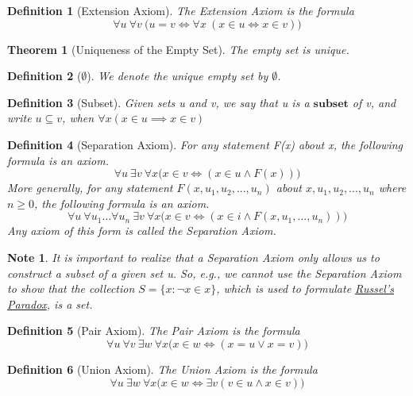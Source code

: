 \documentclass[11pt, oneside]{book}
\theoremstyle{break}
\newtheorem{thm}{Theorem}[section]
\newtheorem*{note}{Note}
\newtheorem{defn}{Definition}[section]
\begin{document}
\begin{defn}[Extension Axiom]
	The Extension Axiom is the formula
	\[
		\forall u \> \forall v \> \Big(u = v \iff \forall x \> (x \in u \iff x \in v) \Big)
	\]
\end{defn}

\begin{thm}[Uniqueness of the Empty Set]
	The empty set is unique.
\end{thm}

\begin{defn}[$\emptyset$]
	We denote the unique empty set by $\emptyset$.
\end{defn}

\begin{defn}[Subset]
	Given sets u and v, we say that u is a $\textbf{subset}$ of v, and write $u \subseteq v$, when $\forall x (x \in u \implies x \in v)$
\end{defn}

\begin{defn}[Separation Axiom]
	For any statement F(x) about x, the following formula is an axiom.
	\[
		\forall u \> \exists v \> \forall x \Big(x \in v \iff (x \in u \land F(x)) \Big)
	\]
	More generally, for any statement $F(x, u_1, u_2, ..., u_n)$ about $x, u_1, u_2, ..., u_n$ where $n \geq 0$, the following formula is an axiom.
	\[
		\forall u \> \forall u_1 \hdots \forall u_n \> \exists v \> \forall x \Big( x \in v \iff (x \in i \land F(x, u_1, ..., u_n)) \Big)
	\]
	Any axiom of this form is called the Separation Axiom.
\end{defn}

\begin{note}
	It is important to realize that a Separation Axiom only allows us to construct a subset of a given set u. So, e.g., we cannot use the Separation Axiom to show that the collection $S = \{x : \neg x \in x\}$, which is used to formulate \hyperref[russel_paradox]{Russel's Paradox}, is a set.
\end{note}

\begin{defn}[Pair Axiom]
	The Pair Axiom is the formula
	\[
		\forall u \> \forall v \> \exists w \> \forall x \Big( x \in w \iff (x = u \lor x = v) \Big)
	\]
\end{defn}

\begin{defn}[Union Axiom]\label{union_axiom}
	The Union Axiom is the formula
	\[
		\forall u \> \exists w \> \forall x \Big( x \in w \iff \exists v (v \in u \land x \in v) \Big)
	\]
\end{defn}
\end{document}
